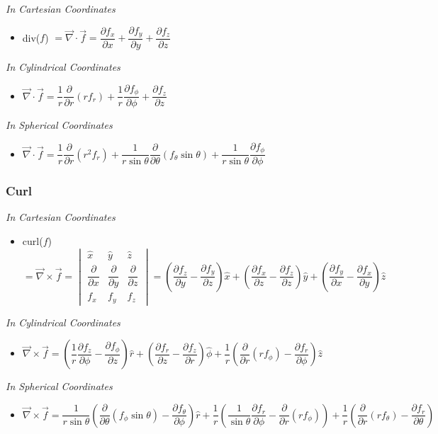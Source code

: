 \documentclass[]{report}
\newcommand \tab[1][1cm]{\hspace*{#1}}
\newcommand{\pp}[2]{\dfrac{\partial #1}{\partial #2}}
\newcommand{\curl}{\vec{\nabla}\times}
\newcommand{\divergence}{\vec{\nabla}\cdot}
\newcommand{\itemt}{\item \tab}
\begin{document}
\textit{In Cartesian Coordinates}
\begin{itemize}
\itemt div($f$) \( = \divergence{\vec{f}} = \pp{f_x}{x} + \pp{f_y}{y} + \pp{f_z}{z} \)
\end{itemize}

\textit{In Cylindrical Coordinates}
\begin{itemize}
\itemt\( \divergence{\vec{f}} = \dfrac{1}{r}\pp{}{r}(rf_r) + \dfrac{1}{r}\pp{f_\phi}{\phi} + \pp{f_z}{z} \)
\end{itemize}

\textit{In Spherical Coordinates}
\begin{itemize}
\itemt\( \divergence{\vec{f}} = \dfrac{1}{r}\pp{}{r}(r^2f_r) + \dfrac{1}{r\sin\theta}\pp{}{\theta}(f_\theta \sin\theta) + \dfrac{1}{r\sin\theta}\pp{f_\phi}{\phi} \)
\end{itemize}

\subsubsection{Curl}
\def\arraystretch{1.5}
\textit{\hspace*{0.4cm} In Cartesian Coordinates}
\begin{itemize}
\itemt curl($f$) \( = \curl\vec{f} = 
\begin{vmatrix}
\hat{x} 	& \hat{y} 		& \hat{z} \\
\pp{}{x} & \pp{}{y} 	& \pp{}{z} \\
f_x			& f_y 			& f_z
\end{vmatrix}        
	= (\pp{f_z}{y} - \pp{f_y}{z})\hat{x} + (\pp{f_x}{z} - \pp{f_z}{z})\hat{y} + (\pp{f_y}{x} - \pp{f_x}{y})\hat{z} \)
\end{itemize}

\textit{In Cylindrical Coordinates}
\begin{itemize}
\itemt \( \curl\vec{f} = (\dfrac{1}{r} \pp{f_z}{\phi} - \pp{f_\phi}{z})\hat{r} + (\pp{f_r}{z} - \pp{f_z}{r})\hat{\phi} + \dfrac{1}{r} (\pp{}{r} (r f_\phi) - \pp{f_r}{\phi})\hat{z} \)
\end{itemize}

\textit{In Spherical Coordinates}                
\begin{itemize}
\itemt \( \curl\vec{f} = \dfrac{1}{r\sin\theta} (\pp{}{\theta} (f_\phi \sin\theta) - \pp{f_\theta}{\phi})\hat{r} + \dfrac{1}{r}(\dfrac{1}{\sin\theta} \pp{f_r}{\phi} - \pp{}{r} (rf_\phi)) + \dfrac{1}{r}(\pp{}{r}(rf_\theta) - \pp{f_r}{\theta})\)
\end{itemize}
\end{document}
